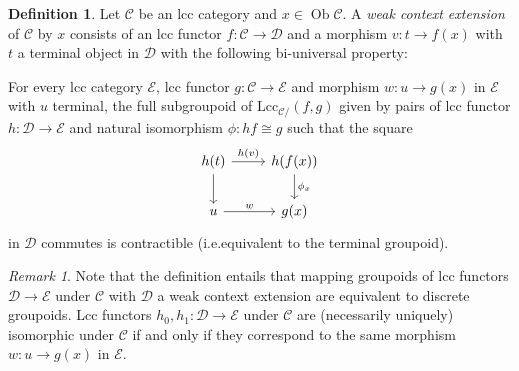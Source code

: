 \documentclass[a4paper]{article}
\theoremstyle{remark}
\newtheorem{remark}[theorem]{Remark}
\theoremstyle{definition}
\newtheorem{definition}[theorem]{Definition}
\begin{document}
\begin{definition}
  \label{def:weak-ext}
  Let $\mathcal{C}$ be an lcc category and $x \in \operatorname{Ob} \mathcal{C}$.
  A \emph{weak context extension} of $\mathcal{C}$ by $x$ consists of an lcc functor $f : \mathcal{C} \rightarrow \mathcal{D}$ and a morphism $v : t \rightarrow f(x)$ with $t$ a terminal object in $\mathcal{D}$ with the following bi-universal property:

  For every lcc category $\mathcal{E}$, lcc functor $g : \mathcal{C} \rightarrow \mathcal{E}$ and morphism $w : u \rightarrow g(x)$ in $\mathcal{E}$ with $u$ terminal, the full subgroupoid of $\mathrm{Lcc}_{\mathcal{C} /}(f, g)$ given by pairs of lcc functor $h : \mathcal{D} \rightarrow \mathcal{E}$ and natural isomorphism $\phi : hf \cong g$ such that the square
  \begin{equation}
    \begin{tikzcd}
      h(t) \arrow[d] \arrow[r, "h(v)"] & h(f(x)) \arrow[d, "\phi_x"] \\
      u \arrow[r, "w"] & g(x)
    \end{tikzcd}
  \end{equation}
  in $\mathcal{D}$ commutes is contractible (i.e.\@ equivalent to the terminal groupoid).
\end{definition}

\begin{remark}
  \label{rem:discrete-weak-ext-mapping}
  Note that the definition entails that mapping groupoids of lcc functors $\mathcal{D} \rightarrow \mathcal{E}$ under $\mathcal{C}$ with $\mathcal{D}$ a weak context extension are equivalent to discrete groupoids.
  Lcc functors $h_0, h_1 : \mathcal{D} \rightarrow \mathcal{E}$ under $\mathcal{C}$ are (necessarily uniquely) isomorphic under $\mathcal{C}$ if and only if they correspond to the same morphism $w : u \rightarrow g(x)$ in $\mathcal{E}$.
\end{remark}
\end{document}
